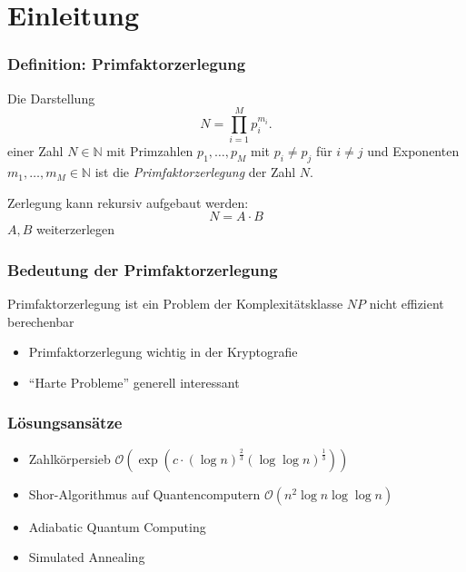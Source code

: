 \section{Einleitung}

\begin{frame}
  \frametitle{Definition: Primfaktorzerlegung}
  \begin{definition}
    Die Darstellung
    \begin{equation*}
      N=\prod\limits_{i=1}^M p_i^{m_i}.
    \end{equation*}
    einer Zahl $N\in\mathbb{N}$ mit Primzahlen $p_1,\dots,p_M$ mit $p_i \neq p_j$ für $i \neq j$ und Exponenten $m_1,\dots,m_M\in\mathbb{N}$ ist die \textit{Primfaktorzerlegung} der Zahl $N$.
  \end{definition}
  \pause{}

  Zerlegung kann rekursiv aufgebaut werden:
  \begin{equation*}
    N=A\cdot B
  \end{equation*}
  \Rightarrow{} $A, B$ weiterzerlegen
\end{frame}

\begin{frame}
  \frametitle{Bedeutung der Primfaktorzerlegung}
  Primfaktorzerlegung ist ein Problem der Komplexitätsklasse $NP$
  \pause{}
  \Rightarrow{} nicht effizient berechenbar
  \pause{}
  \begin{itemize}
    \item Primfaktorzerlegung wichtig in der Kryptografie
    \item ``Harte Probleme'' generell interessant
  \end{itemize}
\end{frame}

\begin{frame}
  \frametitle{Lösungsansätze}
  \begin{itemize}
    \setlength{\itemsep}{5pt}
    \item Zahlkörpersieb $\mathcal{O}\left(\exp\left(c\cdot {\left(\log n\right)}^{\frac{2}{3}}{\left(\log\log n\right)}^{\frac{1}{3}}\right)\right)$~\cite{pomerance}
    \item Shor-Algorithmus auf Quantencomputern $\mathcal{O}\left(n^2 \log n \log\log n\right)$~\cite{shor}
    \item Adiabatic Quantum Computing~\cite{suter,xu}
    \item Simulated Annealing~\cite{altschuler}
  \end{itemize}
\end{frame}
